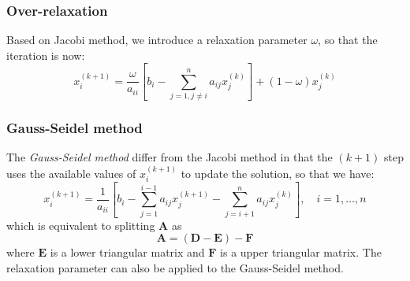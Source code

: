 \documentclass{article}
\begin{document}
\subsubsection{Over-relaxation}
Based on Jacobi method, we introduce a relaxation parameter $\omega$, so that 
the iteration is now:
\begin{equation}
    x_i^{(k+1)} = \frac{\omega}{a_{ii}}\left[
        b_i - \sum_{j=1, j\neq i}^n a_{ij}x_j^{(k)}
    \right] + (1-\omega)x_j^{(k)}
\end{equation}

\subsubsection{Gauss-Seidel method}
The \emph{Gauss-Seidel method} differ from the Jacobi method in that the $(k+1)$
step uses the available values of $x_i^{(k+1)}$ to update the solution, so that 
we have:
\begin{equation}
    x_i^{(k+1)} = \frac{1}{a_{ii}}\left[
        b_i - \sum_{j=1}^{i-1}a_{ij}x_j^{(k+1)} - \sum_{j = i+1}^n a_{ij}x_j^{(k)}
    \right], \quad i = 1, \dots, n
\end{equation}
which is equivalent to splitting $\mathbf{A}$ as 
\[\mathbf{A} = (\mathbf{D}-\mathbf{E}) - \mathbf{F}\] where $\mathbf{E}$ is a 
lower triangular matrix and $\mathbf{F}$ is a upper triangular matrix. 
The relaxation parameter can also be applied to the Gauss-Seidel method.
\end{document}

